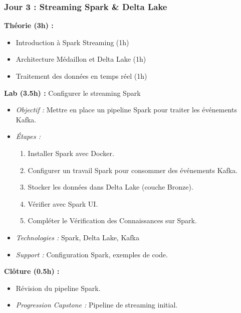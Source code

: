 \documentclass[11pt]{article}
\begin{document}
\subsubsection{Jour 3 : Streaming Spark \& Delta Lake}
\textbf{Théorie (3h) :}
\begin{itemize}
    \item Introduction à Spark Streaming (1h)
    \item Architecture Médaillon et Delta Lake (1h)
    \item Traitement des données en temps réel (1h)
\end{itemize}
\textbf{Lab (3.5h) :} Configurer le streaming Spark
\begin{itemize}
    \item \textit{Objectif :} Mettre en place un pipeline Spark pour traiter les événements Kafka.
    \item \textit{Étapes :}
        \begin{enumerate}
            \item Installer Spark avec Docker.
            \item Configurer un travail Spark pour consommer des événements Kafka.
            \item Stocker les données dans Delta Lake (couche Bronze).
            \item Vérifier avec Spark UI.
            \item Compléter le Vérification des Connaissances sur Spark.
        \end{enumerate}
    \item \textit{Technologies :} Spark, Delta Lake, Kafka
    \item \textit{Support :} Configuration Spark, exemples de code.
\end{itemize}
\textbf{Clôture (0.5h) :}
\begin{itemize}
    \item Révision du pipeline Spark.
    \item \textit{Progression Capstone :} Pipeline de streaming initial.
\end{itemize}
\end{document}
